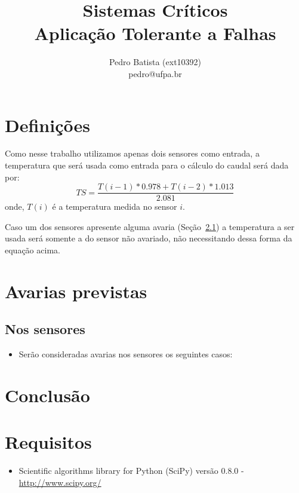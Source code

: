 \documentclass[a4paper,12pt]{article}
\title{Sistemas Críticos\\[10pt]
\Large{Aplicação Tolerante a Falhas}}
\author{Pedro Batista (ext10392)\\
pedro@ufpa.br}
\begin{document}
\maketitle

\section{Definições}
Como nesse trabalho utilizamos apenas dois sensores como entrada, a temperatura
que será usada como entrada para o cálculo do caudal será dada por:
$$TS=\frac{T(i-1)*0.978+T(i-2)*1.013}{2.081}$$
onde,
$T(i)$ é a temperatura medida no sensor $i$.

Caso um dos sensores apresente alguma avaria (Seção~\ref{sec:av_sensor}) a
temperatura a ser usada será somente a do sensor não avariado, não necessitando
dessa forma da equação acima.

\section{Avarias previstas}

\subsection{Nos sensores}\label{sec:av_sensor}
\begin{itemize}
	\item Serão consideradas avarias nos sensores os seguintes casos:
\end{itemize}

\section{Conclusão}

\section{Requisitos}

\begin{itemize}
	\item Scientific algorithms library for Python (SciPy) versão 0.8.0 -
		\url{http://www.scipy.org/}
\end{itemize}
\end{document}
